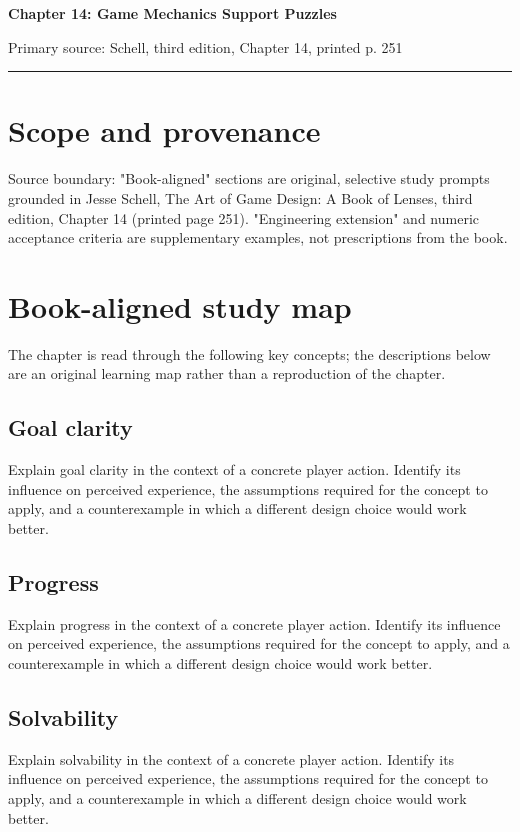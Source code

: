 \documentclass[11pt]{article}
\begin{document}
{\huge\bfseries\color{suiteblue} Chapter 14: Game Mechanics Support Puzzles}\par
\vspace{0.15in}
{\normalsize\color{suitegray} Primary source: Schell, third edition, Chapter 14, printed p. 251}\par
\vspace{0.15in}\hrule\vspace{0.15in}

\section{Scope and provenance}
Source boundary: "Book-aligned" sections are original, selective study prompts grounded in Jesse Schell, The Art of Game Design: A Book of Lenses, third edition, Chapter 14 (printed page 251). "Engineering extension" and numeric acceptance criteria are supplementary examples, not prescriptions from the book.


\section{Book-aligned study map}
The chapter is read through the following key concepts; the descriptions below are an original learning map rather than a reproduction of the chapter.


\subsection{Goal clarity}
Explain goal clarity in the context of a concrete player action. Identify its influence on perceived experience, the assumptions required for the concept to apply, and a counterexample in which a different design choice would work better.


\subsection{Progress}
Explain progress in the context of a concrete player action. Identify its influence on perceived experience, the assumptions required for the concept to apply, and a counterexample in which a different design choice would work better.


\subsection{Solvability}
Explain solvability in the context of a concrete player action. Identify its influence on perceived experience, the assumptions required for the concept to apply, and a counterexample in which a different design choice would work better.
\end{document}

